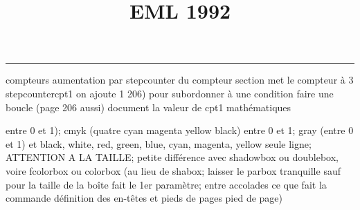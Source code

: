 \documentclass[11pt]{article}%
\title{\bf \vspace{-2cm} EML 1992} %
\author{} %
\date{} %
\renewcommand{\headrulewidth}{0pt}%
\renewcommand{\footrulewidth}{0.4pt}%
\begin{document}
\maketitle %
\vspace{-1.4cm}\hrule %
\thispagestyle{fancy}

\vspace*{.2cm}



compteurs%
aumentation par stepcounter du compteur section%
met le compteur à 3%
stepcounter{cpt1} on ajoute 1%
206) pour subordonner à une condition %
faire une boucle (page 206 aussi) %
document la valeur de cpt1 
mathématiques\newcommand{\ch}{\operatorname{ch}} 
\newcommand{\sh}{\operatorname{sh}}
\renewcommand{\tanh}{\operatorname{th}}
\renewcommand{\sinh}{\operatorname{sh}}
\renewcommand{\cosh}{\operatorname{ch}}
\newcommand{\argsh}{\operatorname{argsh}}
\newcommand{\argch}{\operatorname{argch}}
\newcommand{\argth}{\operatorname{argth}}
\newcommand{\ker}{\operatorname{Ker}}
\renewcommand{\im}{\operatorname{Im}}
\newcommand{\rg}{\operatorname{rg}}
\newcommand{\Id}{\operatorname{Id}}
\newcommand{\id}{\operatorname{id}}
\renewcommand{\leq}{\leq}
\renewcommand{\geq}{\geq }

entre 0 et 1); cmyk (quatre cyan magenta yellow black) entre 0 et 1;
gray (entre 0 et 1) et black, white, red, green, blue, cyan, magenta,
yellow%
seule ligne; ATTENTION A LA TAILLE; petite différence avec shadowbox ou
doublebox, voire fcolorbox ou colorbox (au lieu de shabox; laisser le
parbox tranquille sauf pour la taille de la boîte
\newcommand{\Tbox}[1]{\begin{center} \shabox{\parbox{0.6
\linewidth}{#1}} \end{center}} %
fait le 1er paramètre; entre accolades ce que fait la commande
définition des en-têtes et pieds de pages\pagestyle{fancy}
\chead{}
\rfoot[ \ \thepage]{\thepage}
\cfoot{}
\lfoot{}
\thispagestyle{fancy} %
pied de page)\renewcommand{\footrulewidth}{0.4pt}
\renewcommand{\headrulewidth}{0.4pt}
\end{document}
